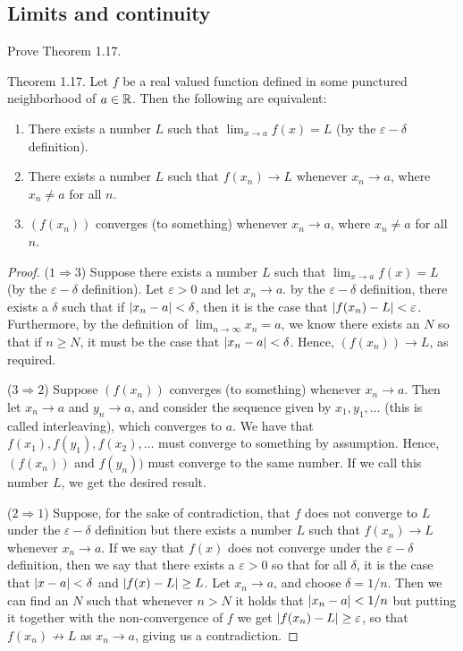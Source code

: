 \subsection{Limits and continuity}


\begin{exercise}{40}
Prove Theorem 1.17. 

Theorem 1.17. Let $f$ be a real valued function defined in some punctured neighborhood of $a\in\mathbb{R}$. Then the following are equivalent:
\begin{enumerate}
    \item There exists a number $L$ such that $\lim_{x\to a}f(x)=L$ (by the $\varepsilon-\delta$ definition).
    \item There exists a number $L$ such that $f(x_n)\to L$ whenever $x_n\to a$, where $x_n\neq a$ for all $n$.
    \item $(f(x_n))$ converges (to something) whenever $x_n\to a$, where $x_n\neq a$ for all $n$.
\end{enumerate}
\end{exercise}
\begin{proof}
($1\Rightarrow 3$) Suppose there exists a number $L$ such that $\lim_{x\to a}f(x) =L$ (by the $\varepsilon-\delta$ definition). Let $\varepsilon>0$ and let $x_n\to a$. by the $\varepsilon-\delta$ definition, there exists a $\delta$ such that if $\left\lvert x_n-a\right\rvert<\delta$, then it is the case that $\left\lvert f(x_n)-L\right\rvert<\varepsilon$. Furthermore, by the definition of $\lim_{n\to\infty}x_n=a$, we know there exists an $N$ so that if $n\geq N$, it must be the case that $\left\lvert x_n-a\right\rvert<\delta$. Hence, $(f(x_n))\to L$, as required.

($3\Rightarrow 2$) Suppose $(f(x_n))$ converges (to something) whenever $x_n\to a$. Then let $x_n\to a$ and $y_n\to a$, and consider the sequence given by $x_1,y_1,\dots$ (this is called interleaving), which converges to $a$. We have that $f(x_1),f(y_1),f(x_2),\dots$ must converge to something by assumption. Hence, $(f(x_n))$ and $f(y_n))$ must converge to the same number. If we call this number $L$, we get the desired result.

($2\Rightarrow 1$) Suppose, for the sake of contradiction, that $f$ does not converge to $L$ under the $\varepsilon-\delta$ definition but there exists a number $L$ such that $f(x_n)\to L$ whenever $x_n\to a$. If we say that $f(x)$ does not converge under the $\varepsilon-\delta$ definition, then we say that there exists a $\varepsilon>0$ so that for all $\delta$, it is the case that $\left\lvert x-a\right\rvert<\delta$ and $\left\lvert f(x)-L\right\rvert\geq L$. Let $x_n\to a$, and choose $\delta =1/n$. Then we can find an $N$ such that whenever $n>N$ it holds that $\left\lvert x_n-a\right\rvert<1/n$ but putting it together with the non-convergence of $f$ we get $\left\lvert f(x_n)-L\right\rvert\geq \varepsilon$, so that $f(x_n)\not\to L$ as $x_n\to a$, giving us a contradiction.
\end{proof} 

